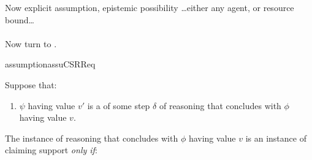 \begin{note}
  Now explicit assumption, epistemic possibility \dots either any agent, or resource bound\dots
\end{note}

\paragraph{\ideaCSB{}}

\begin{note}
  Now turn to \ideaCSB{}.
\end{note}

\begin{note}
  \begin{restatable}{assumption}{assuCSRReq}
    \label{assu:supp:independence}

    Suppose that:
    \begin{enumerate}[label=\Alph*., ref=(\Alph*)]
    \item
      \label{assu:supp:ind:step}
      \(\psi\) having value \(v'\) is a \requ{} of some step \(\delta\) of reasoning that concludes with \(\phi\) having value \(v\).
    \end{enumerate}

    The instance of reasoning that concludes with \(\phi\) having value \(v\) is an instance of claiming support \emph{only if}:


\end{restatable}
\end{note}

